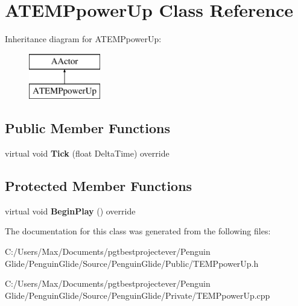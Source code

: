 \hypertarget{class_a_t_e_m_ppower_up}{}\section{A\+T\+E\+M\+Ppower\+Up Class Reference}
\label{class_a_t_e_m_ppower_up}
Inheritance diagram for A\+T\+E\+M\+Ppower\+Up\+:\begin{figure}[H]
\begin{center}
\leavevmode
\includegraphics[height=2.000000cm]{class_a_t_e_m_ppower_up}
\end{center}
\end{figure}
\subsection*{Public Member Functions}
\begin{DoxyCompactItemize}
\item 
\mbox{\label{class_a_t_e_m_ppower_up_ab18d4bf91dbd7ea997b78504cf878db1}} 
virtual void {\bfseries Tick} (float Delta\+Time) override
\end{DoxyCompactItemize}
\subsection*{Protected Member Functions}
\begin{DoxyCompactItemize}
\item 
\mbox{\label{class_a_t_e_m_ppower_up_ab9508c8889af399731afc57e155e8c4d}} 
virtual void {\bfseries Begin\+Play} () override
\end{DoxyCompactItemize}


The documentation for this class was generated from the following files\+:\begin{DoxyCompactItemize}
\item 
C\+:/\+Users/\+Max/\+Documents/pgtbestprojectever/\+Penguin Glide/\+Penguin\+Glide/\+Source/\+Penguin\+Glide/\+Public/T\+E\+M\+Ppower\+Up.\+h\item 
C\+:/\+Users/\+Max/\+Documents/pgtbestprojectever/\+Penguin Glide/\+Penguin\+Glide/\+Source/\+Penguin\+Glide/\+Private/T\+E\+M\+Ppower\+Up.\+cpp\end{DoxyCompactItemize}
